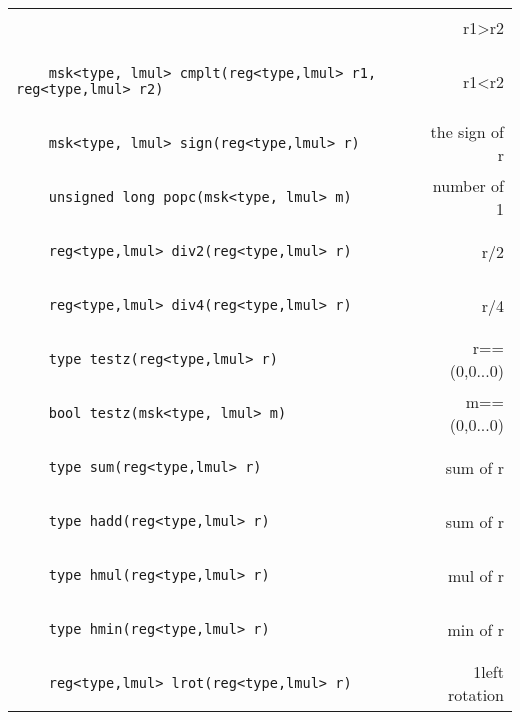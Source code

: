 \begin{center}
\begin{longtable}{l r}
\begin{lstlisting}
\end{lstlisting} & r1>r2\\
\begin{lstlisting}
    msk<type, lmul> cmplt(reg<type,lmul> r1, reg<type,lmul> r2)
\end{lstlisting} & r1<r2\\
\begin{lstlisting}
    msk<type, lmul> sign(reg<type,lmul> r)
\end{lstlisting} & the sign of r\\
\begin{lstlisting}
    unsigned long popc(msk<type, lmul> m)
\end{lstlisting} & number of 1\\
\begin{lstlisting}
    reg<type,lmul> div2(reg<type,lmul> r)
\end{lstlisting} & r/2\\
\begin{lstlisting}
    reg<type,lmul> div4(reg<type,lmul> r)
\end{lstlisting} & r/4\\
\begin{lstlisting}
    type testz(reg<type,lmul> r)
\end{lstlisting} & r==(0,0...0)\\
\begin{lstlisting}
    bool testz(msk<type, lmul> m)
\end{lstlisting} & m==(0,0...0)\\
\begin{lstlisting}
    type sum(reg<type,lmul> r)
\end{lstlisting} & sum of r\\
\begin{lstlisting}
    type hadd(reg<type,lmul> r)
\end{lstlisting} & sum of r\\
\begin{lstlisting}
    type hmul(reg<type,lmul> r)
\end{lstlisting} & mul of r\\
\begin{lstlisting}
    type hmin(reg<type,lmul> r)
\end{lstlisting} & min of r\\
\begin{lstlisting}
    reg<type,lmul> lrot(reg<type,lmul> r)
\end{lstlisting} & 1left rotation\\

\end{longtable}
\end{center}
